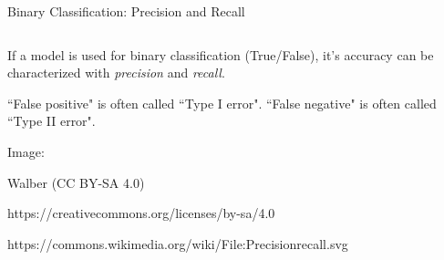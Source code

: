 \begin{frame}{Binary Classification: Precision and Recall}
    \begin{columns}
        \begin{column}{0.6\linewidth}
            If a model is used for binary classification (True/False), it's accuracy can be characterized with \emph{precision} and \emph{recall}.
            
            ``False positive" is often called ``Type I error". ``False negative" is often called ``Type II error".
            
            \vspace{40pt}
            {\tiny
            Image:
            \vspace{8pt}
            
            Walber (CC BY-SA 4.0)
            
            https://creativecommons.org/licenses/by-sa/4.0
            
            https://commons.wikimedia.org/wiki/File:Precisionrecall.svg}
        \end{column}
        \begin{column}{0.4\linewidth}
            \vspace{10pt}
            

\end{column}
\end{columns}
\end{frame}
